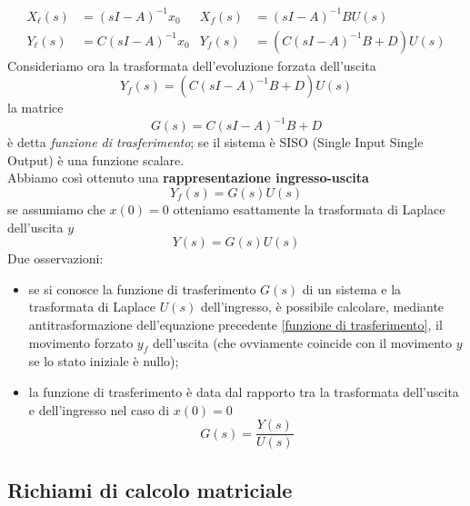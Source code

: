 \documentclass{article}
\numberwithin{equation}{subsection}
\let\oldsubsection\subsection%
\renewcommand{\subsection}{%
  \renewcommand{\theequation}{\thesubsection.\arabic{equation}}%
  \oldsubsection}%
\begin{document}
\begin{align*}
    X_\ell(s) &= (sI-A)^{-1}x_0 & X_f(s) &= (sI-A)^{-1} BU(s)\\
    Y_\ell(s) &= C(sI-A)^{-1}x_0 & Y_f(s) &= \left(C(sI-A)^{-1}B+D\right)U(s)  
\end{align*}
Consideriamo ora la trasformata dell'evoluzione forzata dell'uscita
\begin{equation*}
    Y_f(s) = \left(C(sI-A)^{-1}B+D\right) U(s)
\end{equation*}
la matrice
\begin{equation*}
    G(s) = C(sI-A)^{-1}B+D
\end{equation*}
è detta \textit{funzione di trasferimento}; se il sistema è SISO (Single Input Single Output) è una funzione scalare.
\vspace*{0.1cm}\\
Abbiamo così ottenuto una \textbf{rappresentazione ingresso-uscita}
\begin{equation}
    Y_f(s) = G(s)U(s)
\end{equation}
se assumiamo che $x(0)=0$ otteniamo esattamente la trasformata di Laplace dell'uscita $y$
\begin{equation}\label{funzione di trasferimento}
    Y(s) = G(s)U(s)
\end{equation}
Due osservazioni:
\begin{itemize}[label=$\triangleright$]
    \item se si conosce la funzione di trasferimento $G(s)$ di un sistema e la trasformata di Laplace $U(s)$ dell'ingresso, è possibile calcolare, mediante antitrasformazione dell'equazione precedente \ref{funzione di trasferimento}, il movimento forzato $y_f$ dell'uscita (che ovviamente coincide con il movimento $y$ se lo stato iniziale è nullo);
    \item la funzione di trasferimento è data dal rapporto tra la trasformata dell'uscita e dell'ingresso nel caso di $x(0)=0$
    \begin{equation}
        G(s) = \frac{Y(s)}{U(s)}
    \end{equation}
\end{itemize}

\subsection{Richiami di calcolo matriciale}
\end{document}
